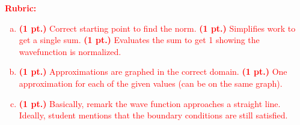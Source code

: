 \documentclass[12pt]{article} %
\begin{document}
\textcolor{red}{
\noindent \textbf{Rubric:}
\begin{enumerate}[(a)]
    \item \textbf{(1 pt.)} Correct starting point to find the norm. \textbf{(1 pt.)} Simplifies work to get a single sum. \textbf{(1 pt.)} Evaluates the sum to get 1 showing the wavefunction is normalized.
    \item \textbf{(1 pt.)} Approximations are graphed in the correct domain. \textbf{(1 pt.)} One approximation for each of the given values (can be on the same graph).
    \item \textbf{(1 pt.)} Basically, remark the wave function approaches a straight line. Ideally, student mentions that the boundary conditions are still satisfied.
\end{enumerate}
}
\end{document}
